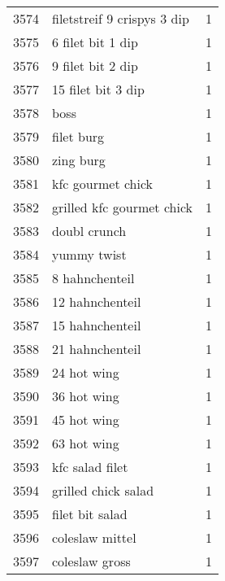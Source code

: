 \begin{tabular}{llr}
3574 &                        filetstreif 9 crispys 3 dip &      1 \\
3575 &                                  6 filet bit 1 dip &      1 \\
3576 &                                  9 filet bit 2 dip &      1 \\
3577 &                                 15 filet bit 3 dip &      1 \\
3578 &                                               boss &      1 \\
3579 &                                         filet burg &      1 \\
3580 &                                          zing burg &      1 \\
3581 &                                  kfc gourmet chick &      1 \\
3582 &                          grilled kfc gourmet chick &      1 \\
3583 &                                       doubl crunch &      1 \\
3584 &                                        yummy twist &      1 \\
3585 &                                     8 hahnchenteil &      1 \\
3586 &                                    12 hahnchenteil &      1 \\
3587 &                                    15 hahnchenteil &      1 \\
3588 &                                    21 hahnchenteil &      1 \\
3589 &                                        24 hot wing &      1 \\
3590 &                                        36 hot wing &      1 \\
3591 &                                        45 hot wing &      1 \\
3592 &                                        63 hot wing &      1 \\
3593 &                                    kfc salad filet &      1 \\
3594 &                                grilled chick salad &      1 \\
3595 &                                    filet bit salad &      1 \\
3596 &                                    coleslaw mittel &      1 \\
3597 &                                     coleslaw gross &      1 \\

\end{tabular}
